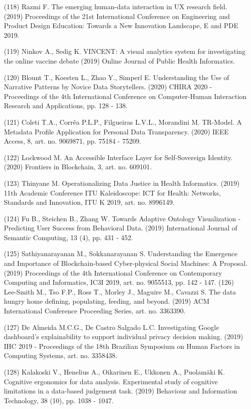 \documentclass[
	12pt,				%
	oneside,			%
	a4paper,			%
	english,			%
	brazil				%
	]{abntex2ppgsi}
\begin{document}
\begin{apendicesenv}
(118) Razmi F. The emerging human-data interaction in UX research field. (2019) Proceedings of the 21st International Conference on Engineering and Product Design Education: Towards a New Innovation Landscape, E and PDE 2019.

(119) Ninkov A., Sedig K. VINCENT: A visual analytics system for investigating the online vaccine debate (2019) Online Journal of Public Health Informatics.

(120) Blount T., Koesten L., Zhao Y., Simperl E. Understanding the Use of Narrative Patterns by Novice Data Storytellers. (2020) CHIRA 2020 - Proceedings of the 4th International Conference on Computer-Human Interaction Research and Applications, pp. 128 - 138.

(121) Coleti T.A., Corrêa P.L.P., Filgueiras L.V.L., Morandini M. TR-Model. A Metadata Profile Application for Personal Data Transparency. (2020) IEEE Access, 8, art. no. 9069871, pp. 75184 - 75209.

(122) Lockwood M. An Accessible Interface Layer for Self-Sovereign Identity. (2020) Frontiers in Blockchain, 3, art. no. 609101.

(123) Thinyane M. Operationalizing Data Justice in Health Informatics. (2019) 11th Academic Conference ITU Kaleidoscope: ICT for Health: Networks, Standards and Innovation, ITU K 2019, art. no. 8996149.

(124) Fu B., Steichen B., Zhang W. Towards Adaptive Ontology Visualization - Predicting User Success from Behavioral Data. (2019) International Journal of Semantic Computing, 13 (4), pp. 431 - 452.

(125) Sathiyanarayanan M., Sokkanarayanan S. Understanding the Emergence and Importance of Blockchain-based Cyber-physical Social Machines: A Proposal. (2019) Proceedings of the 4th International Conference on Contemporary Computing and Informatics, IC3I 2019, art. no. 9055513, pp. 142 - 147.
(126) Lee-Smith M., Tso F.P., Ross T., Morley J., Maguire M., Cavazzi S. The data hungry home defining, populating, feeding, and beyond. (2019) ACM International Conference Proceeding Series, art. no. 3363390.

(127) De Almeida M.C.G., De Castro Salgado L.C. Investigating Google dashboard's explainability to support individual privacy decision making. (2019) IHC 2019 - Proceedings of the 18th Brazilian Symposium on Human Factors in Computing Systems, art. no. 3358438.

(128) Kalakoski V., Henelius A., Oikarinen E., Ukkonen A., Puolamäki K. Cognitive ergonomics for data analysis. Experimental study of cognitive limitations in a data-based judgement task. (2019) Behaviour and Information Technology, 38 (10), pp. 1038 - 1047.


\end{apendicesenv}
\end{document}
